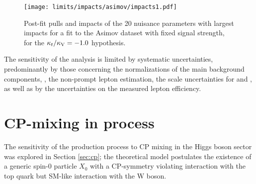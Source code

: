 \begin{figure} [!h]
 \centering
 \texttt{[image: limits/impacts/asimov/impacts1.pdf]}\\
\caption[Post-fit pulls an impacts for a fit to the Asimov dataset.]{Post-fit pulls and impacts of the 20 nuisance parameters with largest impacts for a fit to the Asimov dataset with fixed signal strength, for the $\kappa_t/\kappa_\text{V}=-1.0$ hypothesis.}
\label{fig:impacts_asimov}
\end{figure}

The sensitivity of the analysis is limited by systematic uncertainties, predominantly by those concerning the normalizations of the main background components, \ie, the non-prompt lepton estimation, the scale uncertainties for \ttW and \ttZ, as well as by the uncertainties on the measured lepton efficiency.

\section{CP-mixing in \tH process}

The sensitivity of the \tH production process to CP mixing in the Higgs boson sector was explored in Section \ref{sec:cp}; the theoretical model postulates the existence of a generic spin-0 particle $X_0$ with a CP-symmetry violating interaction with the top quark but SM-like interaction with the W boson.

